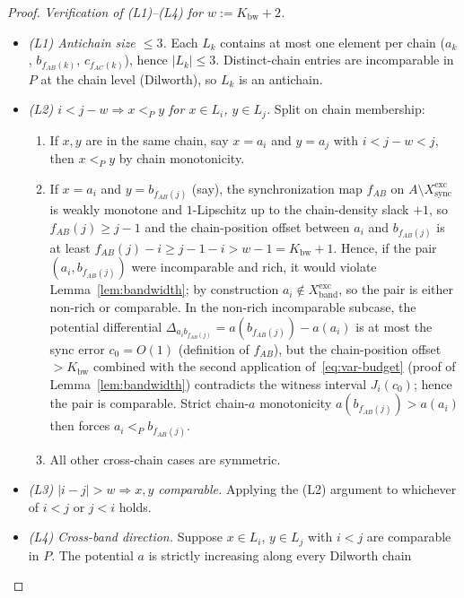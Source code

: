 \begin{proof}
\emph{Verification of (L1)--(L4) for $w := K_{\mathrm{bw}} + 2$.}
\begin{itemize}[nosep, leftmargin=*]
 \item \emph{(L1) Antichain size $\le 3$.}  Each $L_k$ contains at
  most one element per chain ($a_k$, $b_{f_{AB}(k)}$,
  $c_{f_{AC}(k)}$), hence $|L_k| \le 3$.  Distinct-chain entries are
  incomparable in $P$ at the chain level (Dilworth), so $L_k$ is an
  antichain.
 \item \emph{(L2) $i < j - w \Rightarrow x <_P y$ for $x \in L_i$,
  $y \in L_j$.}  Split on chain membership:
  \begin{enumerate}[nosep, label=\textbullet]
   \item If $x, y$ are in the same chain, say $x = a_i$ and
    $y = a_j$ with $i < j - w < j$, then $x <_P y$ by chain
    monotonicity.
   \item If $x = a_i$ and $y = b_{f_{AB}(j)}$ (say), the
    synchronization map $f_{AB}$ on $A \setminus
    X^{\mathrm{exc}}_{\mathrm{sync}}$ is weakly monotone and
    $1$-Lipschitz up to the chain-density slack $+1$, so
    $f_{AB}(j) \ge j - 1$ and the chain-position offset between
    $a_i$ and $b_{f_{AB}(j)}$ is at least
    $f_{AB}(j) - i \ge j - 1 - i > w - 1 = K_{\mathrm{bw}} + 1$.
    Hence, if the pair $(a_i, b_{f_{AB}(j)})$ were incomparable and
    rich, it would violate Lemma~\ref{lem:bandwidth}; by
    construction $a_i \notin X^{\mathrm{exc}}_{\mathrm{band}}$, so the
    pair is either non-rich or comparable.  In the non-rich
    incomparable subcase, the potential differential
    $\Delta_{a_i b_{f_{AB}(j)}} = a(b_{f_{AB}(j)}) - a(a_i)$ is at
    most the sync error $c_0 = O(1)$ (definition of $f_{AB}$), but
    the chain-position offset $> K_{\mathrm{bw}}$ combined with the
    second application of~\eqref{eq:var-budget} (proof of
    Lemma~\ref{lem:bandwidth}) contradicts the witness interval
    $J_i(c_0)$; hence the pair is comparable.  Strict chain-$a$
    monotonicity $a(b_{f_{AB}(j)}) > a(a_i)$ then forces
    $a_i <_P b_{f_{AB}(j)}$.
   \item All other cross-chain cases are symmetric.
  \end{enumerate}
 \item \emph{(L3) $|i - j| > w \Rightarrow x, y$ comparable.}
  Applying the (L2) argument to whichever of $i < j$ or $j < i$
  holds.
 \item \emph{(L4) Cross-band direction.}  Suppose $x \in L_i$,
  $y \in L_j$ with $i < j$ are comparable in $P$.  The potential $a$
  is strictly increasing along every Dilworth chain

\end{itemize}
\end{proof}
